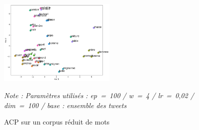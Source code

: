 \documentclass[11pt,french,french]{article}
\begin{document}
\begin{figure}[h]
\begin{center}
\includegraphics[width=0.5\textwidth]{img/acp_gensim.png}
\captionsetup{margin=0cm,format=hang,justification=justified}
\caption{ACP sur un corpus réduit de mots}\label{fig:acp_gensim}
\end{center}
\vspace{-0.3cm}
\footnotesize
\emph{Note : Paramètres utilisés : ep = 100 / w = 4 / lr = 0,02 / dim = 100 / base : ensemble des tweets }
\end{figure}
\end{document}
